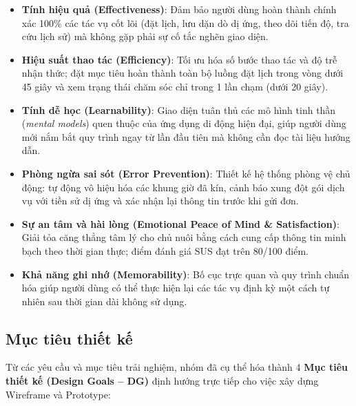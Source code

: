 \begin{itemize}
    \item \textbf{Tính hiệu quả (Effectiveness)}: Đảm bảo người dùng hoàn thành chính xác 100\% các tác vụ cốt lõi (đặt lịch, lưu dặn dò dị ứng, theo dõi tiến độ, tra cứu lịch sử) mà không gặp phải sự cố tắc nghẽn giao diện.
    \item \textbf{Hiệu suất thao tác (Efficiency)}: Tối ưu hóa số bước thao tác và độ trễ nhận thức; đặt mục tiêu hoàn thành toàn bộ luồng đặt lịch trong vòng dưới 45 giây và xem trạng thái chăm sóc chỉ trong 1 lần chạm (dưới 20 giây).
    \item \textbf{Tính dễ học (Learnability)}: Giao diện tuân thủ các mô hình tinh thần (\textit{mental models}) quen thuộc của ứng dụng di động hiện đại, giúp người dùng mới nắm bắt quy trình ngay từ lần đầu tiên mà không cần đọc tài liệu hướng dẫn.
    \item \textbf{Phòng ngừa sai sót (Error Prevention)}: Thiết kế hệ thống phòng vệ chủ động: tự động vô hiệu hóa các khung giờ đã kín, cảnh báo xung đột gói dịch vụ với tiền sử dị ứng và xác nhận lại thông tin trước khi gửi đơn.
    \item \textbf{Sự an tâm và hài lòng (Emotional Peace of Mind \& Satisfaction)}: Giải tỏa căng thẳng tâm lý cho chủ nuôi bằng cách cung cấp thông tin minh bạch theo thời gian thực; điểm đánh giá SUS đạt trên 80/100 điểm.
    \item \textbf{Khả năng ghi nhớ (Memorability)}: Bố cục trực quan và quy trình chuẩn hóa giúp người dùng có thể thực hiện lại các tác vụ định kỳ một cách tự nhiên sau thời gian dài không sử dụng.
\end{itemize}

\subsection{Mục tiêu thiết kế}
Từ các yêu cầu và mục tiêu trải nghiệm, nhóm đã cụ thể hóa thành 4 \textbf{Mục tiêu thiết kế (Design Goals -- DG)} định hướng trực tiếp cho việc xây dựng Wireframe và Prototype:

